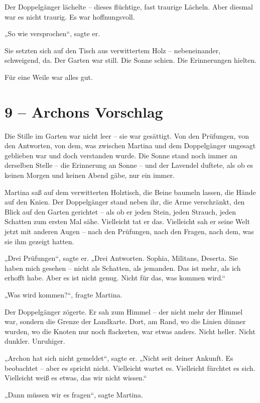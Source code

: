\documentclass[
]{article}
\begin{document}
Der Doppelgänger lächelte -- dieses flüchtige, fast traurige Lächeln. Aber diesmal war es nicht traurig. Es war hoffnungsvoll.

„So wie versprochen``, sagte er.

Sie setzten sich auf den Tisch aus verwittertem Holz -- nebeneinander, schweigend, da. Der Garten war still. Die Sonne schien. Die Erinnerungen hielten.

Für eine Weile war alles gut.

\section{9 -- Archons Vorschlag}\label{archons-vorschlag}

Die Stille im Garten war nicht leer -- sie war gesättigt. Von den Prüfungen, von den Antworten, von dem, was zwischen Martina und dem Doppelgänger ungesagt geblieben war und doch verstanden wurde. Die Sonne stand noch immer an derselben Stelle -- die Erinnerung an Sonne -- und der Lavendel duftete, als ob es keinen Morgen und keinen Abend gäbe, nur ein immer.

Martina saß auf dem verwitterten Holztisch, die Beine baumeln lassen, die Hände auf den Knien. Der Doppelgänger stand neben ihr, die Arme verschränkt, den Blick auf den Garten gerichtet -- als ob er jeden Stein, jeden Strauch, jeden Schatten zum ersten Mal sähe. Vielleicht tat er das. Vielleicht sah er seine Welt jetzt mit anderen Augen -- nach den Prüfungen, nach den Fragen, nach dem, was sie ihm gezeigt hatten.

„Drei Prüfungen``, sagte er. „Drei Antworten. Sophia, Militans, Deserta. Sie haben mich gesehen -- nicht als Schatten, als jemanden. Das ist mehr, als ich erhofft habe. Aber es ist nicht genug. Nicht für das, was kommen wird.``

„Was wird kommen?{\kern0pt}``, fragte Martina.

Der Doppelgänger zögerte. Er sah zum Himmel -- der nicht mehr der Himmel war, sondern die Grenze der Landkarte. Dort, am Rand, wo die Linien dünner wurden, wo die Knoten nur noch flackerten, war etwas anders. Nicht heller. Nicht dunkler. Unruhiger.

„Archon hat sich nicht gemeldet``, sagte er. „Nicht seit deiner Ankunft. Es beobachtet -- aber es spricht nicht. Vielleicht wartet es. Vielleicht fürchtet es sich. Vielleicht weiß es etwas, das wir nicht wissen.``

„Dann müssen wir es fragen``, sagte Martina.
\end{document}
